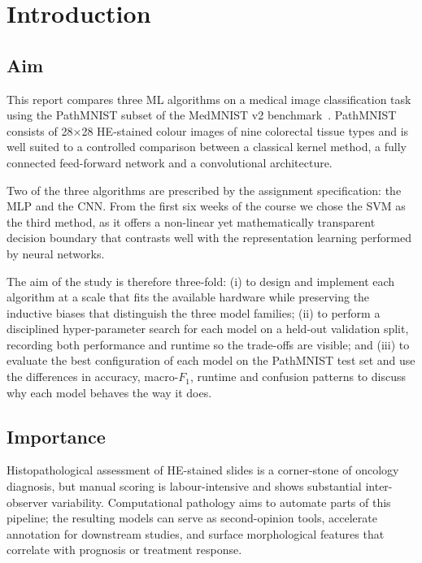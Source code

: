\documentclass[../main.tex]{subfiles}
\begin{document}
\section{Introduction}

\subsection{Aim}
\noindent
This report compares three \gls{ML} algorithms on a medical image
classification task using the PathMNIST subset of the MedMNIST v2
benchmark~\cite{yang2023medmnistv2}. PathMNIST consists of 28$\times$28
\gls{HE}-stained colour images of nine colorectal tissue types and is well
suited to a controlled comparison between a classical kernel method, a fully
connected feed-forward network and a convolutional architecture.

\noindent
Two of the three algorithms are prescribed by the assignment specification:
the \gls{MLP} and the \gls{CNN}. From the first six weeks of the course we
chose the \gls{SVM} as the third method, as it offers a non-linear yet
mathematically transparent decision boundary that contrasts well with the
representation learning performed by neural networks.

\noindent
The aim of the study is therefore three-fold: (i) to design and implement
each algorithm at a scale that fits the available hardware while preserving
the inductive biases that distinguish the three model families; (ii) to
perform a disciplined hyper-parameter search for each model on a held-out
validation split, recording both performance and runtime so the trade-offs
are visible; and (iii) to evaluate the best configuration of each model on
the PathMNIST test set and use the differences in accuracy, macro-$F_{1}$,
runtime and confusion patterns to discuss why each model behaves the way it
does.

\subsection{Importance}
\noindent
Histopathological assessment of \gls{HE}-stained slides is a corner-stone of
oncology diagnosis, but manual scoring is labour-intensive and shows
substantial inter-observer variability. Computational pathology aims to
automate parts of this pipeline; the resulting models can serve as
second-opinion tools, accelerate annotation for downstream studies, and
surface morphological features that correlate with prognosis or treatment
response.
\end{document}

